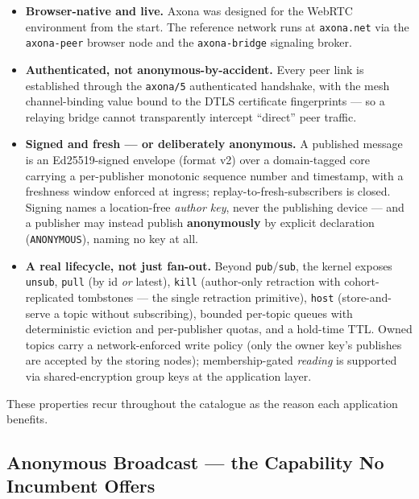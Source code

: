 \documentclass[nobib]{tufte-handout}
\begin{document}
\begin{itemize}
\item \textbf{Browser-native and live.} Axona was designed for the
WebRTC environment from the start. The reference network runs at
\texttt{axona.net} via the \texttt{axona-peer} browser node and the
\texttt{axona-bridge} signaling broker.
\item \textbf{Authenticated, not anonymous-by-accident.} Every peer
link is established through the \texttt{axona/5} authenticated
handshake, with the mesh channel-binding value bound to the DTLS
certificate fingerprints --- so a relaying bridge cannot transparently
intercept ``direct'' peer traffic.
\item \textbf{Signed and fresh --- or deliberately anonymous.} A
published message is an Ed25519-signed envelope (format v2) over a
domain-tagged core carrying a per-publisher monotonic sequence number
and timestamp, with a freshness window enforced at ingress;
replay-to-fresh-subscribers is closed. Signing names a location-free
\emph{author key}, never the publishing device --- and a publisher may
instead publish \textbf{anonymously} by explicit declaration
(\texttt{ANONYMOUS}), naming no key at all.
\item \textbf{A real lifecycle, not just fan-out.} Beyond
\texttt{pub}/\texttt{sub}, the kernel exposes \texttt{unsub},
\texttt{pull} (by id \emph{or} latest), \texttt{kill} (author-only
retraction with cohort-replicated tombstones --- the single retraction
primitive), \texttt{host} (store-and-serve a topic without subscribing),
bounded per-topic queues with deterministic eviction and per-publisher
quotas, and a hold-time TTL. Owned topics carry a network-enforced write policy
(only the owner key's publishes are accepted by the storing nodes);
membership-gated \emph{reading} is supported via shared-encryption group
keys at the application layer.
\end{itemize}

These properties recur throughout the catalogue as the reason each
application benefits.

\subsection{Anonymous Broadcast --- the Capability No Incumbent Offers}
\end{document}
